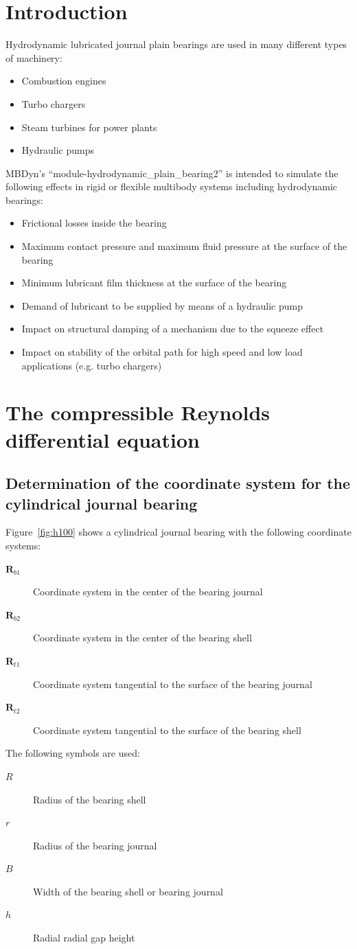 \section{Introduction}
Hydrodynamic lubricated journal plain bearings are used in many different types of machinery:
\begin{itemize}
\item Combustion engines
\item Turbo chargers
\item Steam turbines for power plants
\item Hydraulic pumps
\end{itemize}
MBDyn's ``module-hydrodynamic\_plain\_bearing2'' is intended to simulate the following effects in rigid or flexible multibody systems including hydrodynamic bearings:
\begin{itemize}
\item Frictional losses inside the bearing
\item Maximum contact pressure and maximum fluid pressure at the surface of the bearing
\item Minimum lubricant film thickness at the surface of the bearing
\item Demand of lubricant to be supplied by means of a hydraulic pump
\item Impact on structural damping of a mechanism due to the squeeze effect
\item Impact on stability of the orbital path for high speed and low load applications (e.g. turbo chargers)
\end{itemize}

\section{The compressible Reynolds differential equation}
\subsection{Determination of the coordinate system for the cylindrical journal bearing}
Figure~\ref{fig:h100} shows a cylindrical journal bearing with the following coordinate systems:
\begin{description}
\item[$\boldsymbol{R}_{b1}$] Coordinate system in the center of the bearing journal
\item[$\boldsymbol{R}_{b2}$] Coordinate system in the center of the bearing shell
\item[$\boldsymbol{R}_{t1}$] Coordinate system tangential to the surface of the bearing journal
\item[$\boldsymbol{R}_{t2}$] Coordinate system tangential to the surface of the bearing shell
\end{description}
The following symbols are used:
\begin{description}
\item[$R$] Radius of the bearing shell
\item[$r$] Radius of the bearing journal
\item[$B$] Width of the bearing shell or bearing journal
\item[$h$] Radial radial gap height
\end{description}

